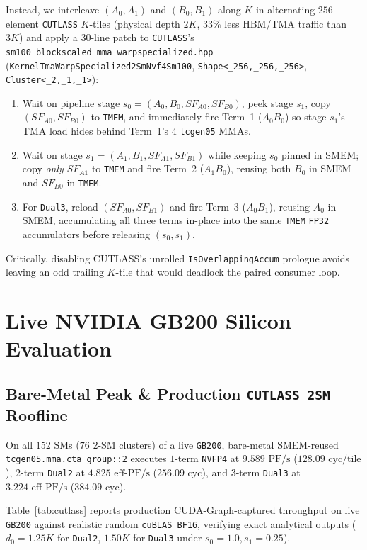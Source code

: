 \documentclass[conference,10pt]{IEEEtran}
\begin{document}
Instead, we interleave $(A_0, A_1)$ and $(B_0, B_1)$ along $K$ in alternating $256$-element \texttt{CUTLASS} $K$-tiles (physical depth $2K$, $33\%$ less HBM/TMA traffic than $3K$) and apply a 30-line patch to \texttt{CUTLASS}'s \texttt{sm100\_blockscaled\_mma\_warpspecialized.hpp} (\texttt{KernelTmaWarpSpecialized2SmNvf4Sm100}, \texttt{Shape<\_256,\_256,\_256>}, \texttt{Cluster<\_2,\_1,\_1>}):
\begin{enumerate}
    \item Wait on pipeline stage $s_0 = (A_0, B_0, SF_{A0}, SF_{B0})$, peek stage $s_1$, copy $(SF_{A0}, SF_{B0})$ to \texttt{TMEM}, and immediately fire Term~1 ($A_0 B_0$) so stage $s_1$'s TMA load hides behind Term~1's $4$ \texttt{tcgen05} MMAs.
    \item Wait on stage $s_1 = (A_1, B_1, SF_{A1}, SF_{B1})$ while keeping $s_0$ pinned in SMEM; copy \emph{only} $SF_{A1}$ to \texttt{TMEM} and fire Term~2 ($A_1 B_0$), reusing both $B_0$ in SMEM and $SF_{B0}$ in \texttt{TMEM}.
    \item For \texttt{Dual3}, reload $(SF_{A0}, SF_{B1})$ and fire Term~3 ($A_0 B_1$), reusing $A_0$ in SMEM, accumulating all three terms in-place into the same \texttt{TMEM} \texttt{FP32} accumulators before releasing $(s_0, s_1)$.
\end{enumerate}
Critically, disabling CUTLASS's unrolled \texttt{IsOverlappingAccum} prologue avoids leaving an odd trailing $K$-tile that would deadlock the paired consumer loop.

\section{Live NVIDIA GB200 Silicon Evaluation}

\subsection{Bare-Metal Peak \& Production \texttt{CUTLASS 2SM} Roofline}
On all $152$ SMs ($76$ 2-SM clusters) of a live \texttt{GB200}, bare-metal SMEM-reused \texttt{tcgen05.mma.cta\_group::2} executes $1$-term \texttt{NVFP4} at $9.589\text{ PF/s}$ ($128.09\text{ cyc/tile}$), $2$-term \texttt{Dual2} at $4.825\text{ eff-PF/s}$ ($256.09\text{ cyc}$), and $3$-term \texttt{Dual3} at \textbf{$3.224\text{ eff-PF/s}$} ($384.09\text{ cyc}$).

Table~\ref{tab:cutlass} reports production CUDA-Graph-captured throughput on live \texttt{GB200} against realistic random \texttt{cuBLAS BF16}, verifying exact analytical outputs ($d_0 = 1.25 K$ for \texttt{Dual2}, $1.50 K$ for \texttt{Dual3} under $s_0{=}1.0, s_1{=}0.25$).
\end{document}
